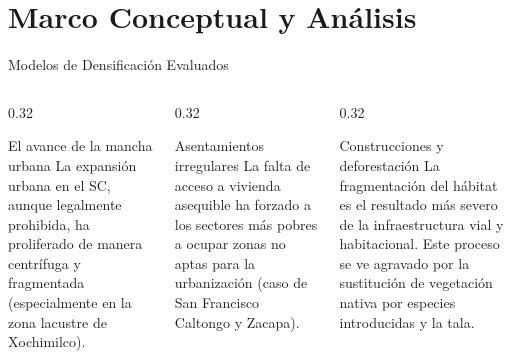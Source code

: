 
\section{Marco Conceptual y Análisis}

\begin{frame}{Modelos de Densificación Evaluados}
  \begin{columns}[T]
    \begin{column}{0.32\textwidth}
      \begin{block}{El avance de la mancha urbana}
        {\small La expansión urbana en el SC, aunque legalmente prohibida, 
        ha proliferado de manera centrífuga y fragmentada (especialmente en la zona lacustre de Xochimilco).}
      \end{block}
    \end{column}
    \begin{column}{0.32\textwidth}
      \begin{block}{Asentamientos irregulares}
        {\small La falta de acceso a vivienda asequible ha forzado a los sectores más pobres a ocupar zonas 
        no aptas para la urbanización (caso de San Francisco Caltongo y Zacapa). }
      \end{block}
    \end{column}
    \begin{column}{0.32\textwidth}
      \begin{block}{Construcciones y deforestación}
        {\small La fragmentación del hábitat es el resultado más severo de la infraestructura vial y habitacional.
        Este proceso se ve agravado por la sustitución de vegetación nativa por especies introducidas y la tala.}
      \end{block}
    \end{column}
  \end{columns}
\end{frame}


